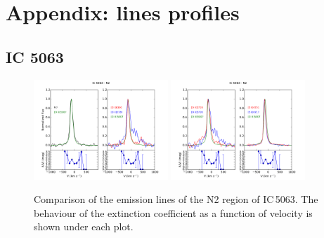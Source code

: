 \documentclass[../thesis.tex]{subfiles}
\begin{document}
\chapter{Appendix: lines profiles}
\label{cap:appendix1}

\section*{IC 5063}

\setcounter{page}{119}

\begin{figure}[h]
\centering
\includegraphics[width=0.45\textwidth]{images/paper1/IC5063_n2_l1.pdf} \quad
\includegraphics[width=0.45\textwidth]{images/paper1/IC5063_n2_l2.pdf}\\
\caption[]{Comparison of the emission lines of the N2 region of IC\,5063. The behaviour of the extinction coefficient as a function of velocity is shown under each plot.}
\label{fig:n2l1_I}
\end{figure}
\end{document}
